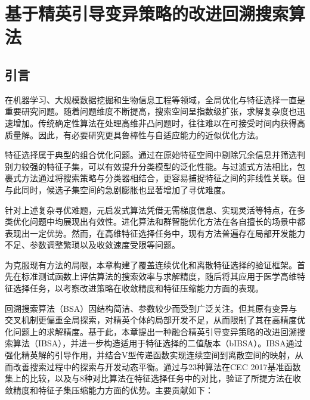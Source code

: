 
\chapter{基于精英引导变异策略的改进回溯搜索算法}
\label{chap:ibsa}

\section{引言}

在机器学习、大规模数据挖掘和生物信息工程等领域，全局优化与特征选择一直是重要研究问题\cite{ibsa_ref7,ibsa_ref13,ibsa_ref15}。随着问题维度不断提高，搜索空间呈指数级扩张，求解复杂度也迅速增加\cite{ibsa_ref1,ibsa_ref3,ibsa_ref5}。传统确定性算法在处理高维非凸问题时，往往难以在可接受时间内获得高质量解。因此，有必要研究更具鲁棒性与自适应能力的近似优化方法。

特征选择属于典型的组合优化问题。通过在原始特征空间中剔除冗余信息并筛选判别力较强的特征子集，可以有效提升分类模型的泛化性能\cite{ibsa_ref17,ibsa_ref18}。与过滤式方法相比，包裹式方法通过将搜索策略与分类器相结合，更容易捕捉特征之间的非线性关联\cite{ibsa_ref20,ibsa_ref22,ibsa_ref23}。但与此同时，候选子集空间的急剧膨胀也显著增加了寻优难度。

针对上述复杂寻优难题，元启发式算法凭借无需梯度信息、实现灵活等特点，在多类优化问题中均展现出有效性\cite{ibsa_ref24}。进化算法和群智能优化方法在各自擅长的场景中都表现出一定优势\cite{ibsa_ref25,ibsa_ref29,ibsa_ref33,ibsa_ref37}。然而，在高维特征选择任务中，现有方法普遍存在局部开发能力不足、参数调整繁琐以及收敛速度受限等问题\cite{ibsa_ref41,ibsa_ref50,ibsa_ref51}。

为克服现有方法的局限，本章构建了覆盖连续优化和离散特征选择的验证框架。首先在标准测试函数上评估算法的搜索效率与求解精度，随后将其应用于医学高维特征选择任务，以考察改进策略在收敛精度和特征压缩能力方面的表现。

回溯搜索算法（BSA）因结构简洁、参数较少而受到广泛关注\cite{ibsa_ref53}。但其原有变异与交叉机制更偏重全局探索，对精英个体的局部开发不足，从而限制了其在高精度优化问题上的求解精度。基于此，本章提出一种融合精英引导变异策略的改进回溯搜索算法（IBSA），并进一步构造适用于特征选择的二值版本（bIBSA）。IBSA通过强化精英解的引导作用，并结合V型传递函数实现连续空间到离散空间的映射，从而改善搜索过程中的探索与开发动态平衡。通过与23种算法在CEC 2017基准函数集上的比较，以及与8种对比算法在特征选择任务中的对比，验证了所提方法在收敛精度和特征子集压缩能力方面的优势。主要贡献如下：

